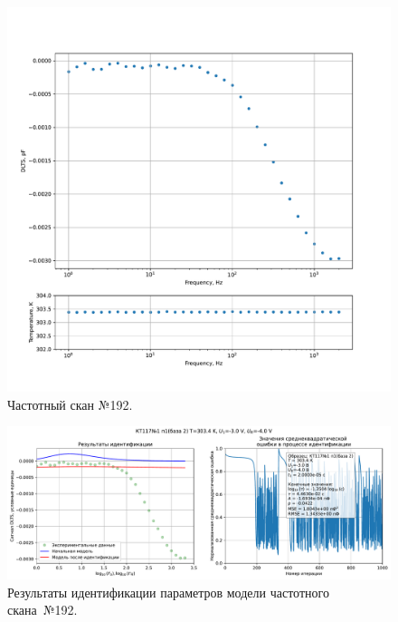 \begin{figure}[!ht]
    \centering
    \includegraphics[width=1\textwidth]{../plots/КТ117№1_п1(база 2)_2500Гц-1Гц_1пФ_+30С_-3В-4В_50мВ_20мкс_шаг_0,1.pdf}
    \caption{Частотный скан №192.}
    \label{pic:frequency_scan_192}
\end{figure}

\begin{figure}[!ht]
    \centering
    \includegraphics[width=1\textwidth]{../plots/КТ117№1_п1(база 2)_2500Гц-1Гц_1пФ_+30С_-3В-4В_50мВ_20мкс_шаг_0,1_model.pdf}
    \caption{Результаты идентификации параметров модели частотного скана~№192.}
    \label{pic:frequency_scan_model192}
\end{figure}

\pagebreak


